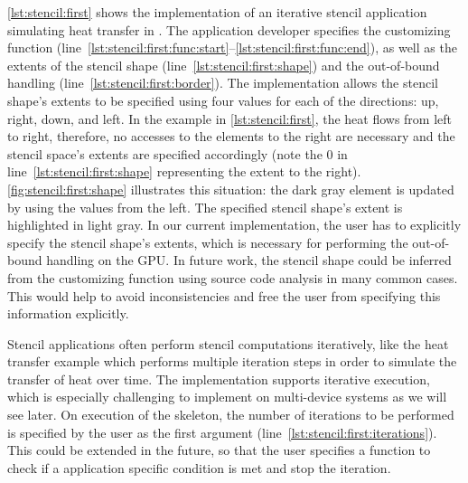 \autoref{lst:stencil:first} shows the implementation of an iterative stencil application simulating heat transfer in \SkelCL.
The application developer specifies the customizing function (line~\ref{lst:stencil:first:func:start}--\ref{lst:stencil:first:func:end}), as well as the extents of the stencil shape (line~\ref{lst:stencil:first:shape}) and the out-of-bound handling (line~\ref{lst:stencil:first:border}).
The  implementation allows the stencil shape's extents to be specified using four values for each of the directions:
up, right, down, and left.
In the example in \autoref{lst:stencil:first}, the heat flows from left to right, therefore, no accesses to the elements to the right are necessary and the stencil space's extents are specified accordingly (note the $0$ in line~\ref{lst:stencil:first:shape} representing the extent to the right).
\autoref{fig:stencil:first:shape} illustrates this situation: the dark gray element is updated by using the values from the left.
The specified stencil shape's extent is highlighted in light gray.
In our current implementation, the user has to explicitly specify the stencil shape's extents, which is necessary for performing the out-of-bound handling on the GPU.
In future work, the stencil shape could be inferred from the customizing function using source code analysis in many common cases.
This would help to avoid inconsistencies and free the user from specifying this information explicitly.

Stencil applications often perform stencil computations iteratively, like the heat transfer example which performs multiple iteration steps in order to simulate the transfer of heat over time.
The  implementation supports iterative execution, which is especially challenging to implement on multi-device systems as we will see later.
On execution of the skeleton, the number of iterations to be performed is specified by the user as the first argument (line~\ref{lst:stencil:first:iterations}).
This could be extended in the future, so that the user specifies a function to check if a application specific condition is met and stop the iteration.

